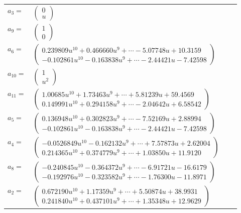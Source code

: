 \documentclass[1p]{elsarticle_modified}
\theoremstyle{definition}
\begin{document}
\begin{tabular}{m{7pt} m{180pt} m{7pt} m{180pt} }
\flushright $a_{3}=$&$\begin{pmatrix}0\\u\end{pmatrix}$ \\
\flushright $a_{9}=$&$\begin{pmatrix}1\\0\end{pmatrix}$ \\
\flushright $a_{6}=$&$\begin{pmatrix}0.239809 u^{10}+0.466660 u^{9}+\cdots-5.07748 u+10.3159\\-0.102861 u^{10}-0.163838 u^{9}+\cdots-2.44421 u-7.42598\end{pmatrix}$ \\
\flushright $a_{10}=$&$\begin{pmatrix}1\\u^2\end{pmatrix}$ \\
\flushright $a_{11}=$&$\begin{pmatrix}1.00685 u^{10}+1.73463 u^{9}+\cdots+5.81239 u+59.4569\\0.149991 u^{10}+0.294158 u^{9}+\cdots-2.04642 u+6.58542\end{pmatrix}$ \\
\flushright $a_{5}=$&$\begin{pmatrix}0.136948 u^{10}+0.302823 u^{9}+\cdots-7.52169 u+2.88994\\-0.102861 u^{10}-0.163838 u^{9}+\cdots-2.44421 u-7.42598\end{pmatrix}$ \\
\flushright $a_{4}=$&$\begin{pmatrix}-0.0526849 u^{10}-0.162132 u^{9}+\cdots+7.57873 u+2.62004\\0.214365 u^{10}+0.374779 u^{9}+\cdots+1.03850 u+11.9120\end{pmatrix}$ \\
\flushright $a_{8}=$&$\begin{pmatrix}-0.240845 u^{10}-0.364372 u^{9}+\cdots-6.91721 u-16.6179\\-0.192976 u^{10}-0.323582 u^{9}+\cdots-1.76300 u-11.8971\end{pmatrix}$ \\
\flushright $a_{2}=$&$\begin{pmatrix}0.672190 u^{10}+1.17359 u^{9}+\cdots+5.50874 u+38.9931\\0.241840 u^{10}+0.437101 u^{9}+\cdots+1.35348 u+12.9629\end{pmatrix}$ \\

\end{tabular}
\end{document}
